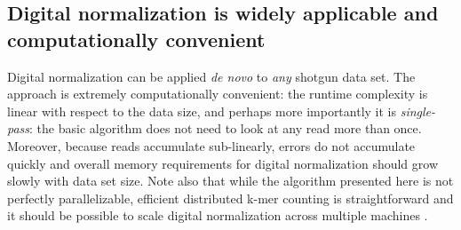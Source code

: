 
\subsection{Digital normalization is widely applicable and computationally convenient}
%
Digital normalization can be applied {\em de novo} to {\em any}
shotgun data set.  The approach is extremely computationally
convenient: the runtime complexity is linear with respect to the data
size, and perhaps more importantly it is {\em single-pass}: the basic
algorithm does not need to look at any read more than once.  Moreover,
because reads accumulate sub-linearly, errors do not accumulate
quickly and overall memory requirements for digital normalization
should grow slowly with data set size.  Note also that while the
algorithm presented here is not perfectly parallelizable, efficient
distributed k-mer counting is straightforward and it should be
possible to scale digital normalization across multiple machines
\cite{pubmed19357099}.

